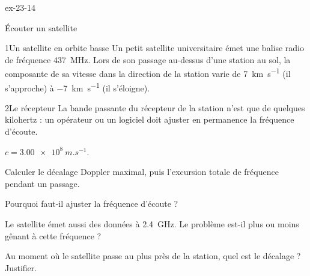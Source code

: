 \begin{blocLivre}{ex-23-14}
\begin{exercice}[3]{Écouter un satellite}
\begin{docu}{1}{Un satellite en orbite basse}
Un petit satellite universitaire émet une balise radio de fréquence \qty{437}{MHz}. Lors de son passage au-dessus d'une
station au sol, la composante de sa vitesse dans la direction de la station varie de \qty{+7}{km.s^{-1}} (il s'approche) à
\qty{-7}{km.s^{-1}} (il s'éloigne).
\end{docu}
\begin{docu}{2}{Le récepteur}
La bande passante du récepteur de la station n'est que de quelques kilohertz : un opérateur ou un logiciel doit ajuster
en permanence la fréquence d'écoute.
\end{docu}
\begin{donnees}
$c=\qty{3,00e8}{m.s^{-1}}$.
\end{donnees}
\begin{questions}
\item Calculer le décalage Doppler maximal, puis l'excursion totale de fréquence pendant un passage.
\item Pourquoi faut-il ajuster la fréquence d'écoute ?
\item \initiative Le satellite émet aussi des données à \qty{2,4}{GHz}. Le problème est-il plus ou moins gênant à cette fréquence ?
\item Au moment où le satellite passe au plus près de la station, quel est le décalage ? Justifier.
\end{questions}
\end{exercice}
\end{blocLivre}
